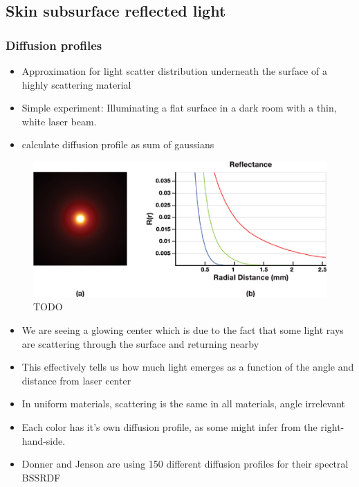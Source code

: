 \documentclass[ngerman,runningheads,a4paper]{llncs}[2018/03/10]
\begin{document}
\subsection{Skin subsurface reflected light}
\label{sub:skin-subsurface-reflect}

\subsubsection{Diffusion profiles}
\label{sub:diffusion-profiles}

\begin{itemize}
  \item Approximation for light scatter distribution underneath the surface of a highly scattering material
  \item Simple experiment: Illuminating a flat surface in a dark room with a thin, white laser beam.
  \item calculate diffusion profile as sum of gaussians
\end{itemize}

\begin{figure}[!h]
\includegraphics[scale=0.7,keepaspectratio]{./images/diffusion-profile-visualization}
\caption{TODO}
\end{figure}

\begin{itemize}
  \item We are seeing a glowing center which is due to the fact that some light rays are scattering through the surface and returning nearby
  \item This effectively tells us how much light emerges as a function of the angle and distance from laser center
  \item In uniform materials, scattering is the same in all materials, angle irrelevant
  \item Each color has it's own diffusion profile, as some might infer from the right-hand-side.
  \item Donner and Jenson are using 150 different diffusion profiles for their spectral BSSRDF
\end{itemize}
\end{document}
